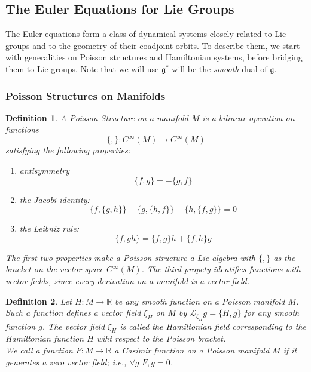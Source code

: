 \documentclass{article}
\newtheorem{defn}{Definition}
\begin{document}
\subsection{The Euler Equations for Lie Groups}


The Euler equations form a class of dynamical systems closely related to Lie groups and to the geometry of their coadjoint orbits. To describe them, we start with generalities on Poisson structures and Hamiltonian systems, before bridging them to Lie groups. Note that we will use $ \mathfrak{g}^*$ will be the \textit{smooth} dual of $ \mathfrak{g}$.

\subsubsection{Poisson Structures on Manifolds}


\begin{defn}

A \textit{Poisson Structure} on a manifold $M$ is a bilinear operation on functions\[
	\{ , \} : C^{\infty}(M) \to C^{\infty}(M)
\]
satisfying the following properties:
\begin{enumerate}
\item antisymmetry
	\[ \{ f,g \} = - \{ g,f \} 	\]
\item the Jacobi identity:
	\[	\{ f, \{ g,h \}  \} + \{ g, \{ h,f \}  \} + \{ h, \{ f,g \}  \} =0\]
\item the Leibniz rule:
	\[ \{ f, gh \} = \{ f,g \} h + \{ f,h \} g	\]
\end{enumerate}
The first two properties make a Poisson structure a Lie algebra with $ \{ , \} $ as the bracket on the vector space $C^{\infty}(M)$. The third propety identifies functions with vector fields, since every derivation on a manifold is a vector field.
\end{defn}


\begin{defn}

	Let $ H: M \to \mathbb{R}$ be any smooth function on a Poisson manifold $M$. Such a function defines a vector field $\xi_H$ on $M$ by $\mathcal{L}_{\xi_H} g = \{ H,g \} $ for any smooth function $g$. The vector field $\xi_H$ is called the \textit{Hamiltonian field} corresponding to the \textit{Hamiltonian function} $H$ wiht respect to the Poisson bracket.\\
	\indent We call a function $ F: M \to \mathbb{R}$ a \textit{Casimir function} on a Poisson manifold $M$ if it generates a zero vector field; i.e., $\forall g \hspace{4pt} {F,g}=0$.

\end{defn}
\end{document}
